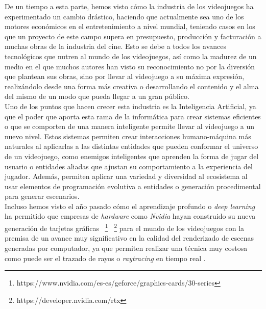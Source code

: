 De un tiempo a esta parte, hemos visto cómo la industria de los videojuegos ha experimentado un cambio drástico, haciendo que actualmente sea uno de los motores económicos en el entretenimiento a nivel mundial, teniendo casos en los que un proyecto de este campo supera en presupuesto, producción y facturación a muchas obras de la industria del cine. Esto se debe a todos los avances tecnológicos que nutren al mundo de los videojuegos, así como la madurez de un medio en el que muchos autores han visto su reconocimiento no por la diversión que plantean sus obras, sino por llevar al videojuego a su máxima expresión, realizándolo desde una forma más creativa o desarrollando el contenido y el alma del mismo de un modo que pueda llegar a un gran público. \\

Uno de los puntos que hacen crecer esta industria es la Inteligencia Artificial, ya que el poder que aporta esta rama de la informática para crear sistemas eficientes o que se comporten de una manera inteligente permite llevar al videojuego a un nuevo nivel. Estos sistemas permiten crear interacciones humano-máquina más naturales al aplicarlas a las distintas entidades que pueden conformar el universo de un videojuego, como enemigos inteligentes que aprenden la forma de jugar del usuario o entidades aliadas que ajustan su comportamiento a la experiencia del jugador. Además, permiten aplicar una variedad y diversidad al ecosistema al usar elementos de programación evolutiva a entidades \cite{5286468} o generación procedimental \cite{parkin_2016} para generar escenarios. \\

Incluso hemos visto el año pasado cómo el aprendizaje profundo o \textit{deep learning} ha permitido que empresas de \textit{hardware} como \textit{Nvidia} hayan construido su nueva generación de tarjetas gráficas~ \footnote{https://www.nvidia.com/es-es/geforce/graphics-cards/30-series}~ \footnote{https://developer.nvidia.com/rtx} para el mundo de los videojuegos con la premisa de un avance muy significativo en la calidad del renderizado de escenas generadas por computador, ya que permiten realizar una técnica muy costosa como puede ser el trazado de rayos o \textit{raytracing} \cite{Whitted:1980:IIM:358876.358882} en tiempo real \cite{Parker:2013:GRT:2447976.2447997}. \\

